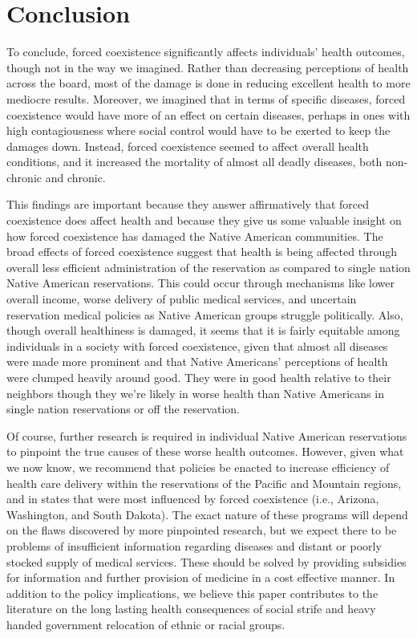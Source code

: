 \documentclass[12pt]{article}
\begin{document}
\section{Conclusion}
To conclude, forced coexistence significantly affects individuals’ health outcomes, though not in the way we imagined.
Rather than decreasing perceptions of health across the board, most of the damage is done in reducing excellent health to more mediocre results.  
Moreover, we imagined that in terms of specific diseases, forced coexistence would have more of an effect on certain diseases, perhaps in ones with high contagiousness where social control would have to be exerted to keep the damages down.  
Instead, forced coexistence seemed to affect overall health conditions, and it increased the mortality of almost all deadly diseases, both non-chronic and chronic.

This findings are important because they answer affirmatively that forced coexistence does affect health and because they give us some valuable insight on how forced coexistence has damaged the Native American communities. 
The broad effects of forced coexistence suggest that health is being affected through overall less efficient administration of the reservation as compared to single nation Native American reservations.  
This could occur through mechanisms like lower overall income, worse delivery of public medical services, and uncertain reservation medical policies as Native American groups struggle politically. 
Also, though overall healthiness is damaged, it seems that it is fairly equitable among individuals in a society with forced coexistence, given that almost all diseases were made more prominent and that Native Americans’ perceptions of health were clumped heavily around good. 
They were in good health relative to their neighbors though they we’re likely in worse health than Native Americans in single nation reservations or off the reservation.  

Of course, further research is required in individual Native American reservations to pinpoint the true causes of these worse health outcomes. 
However, given what we now know, we recommend that policies be enacted to increase efficiency of health care delivery within the reservations of the Pacific and Mountain regions, and in states that were most influenced by forced coexistence (i.e., Arizona, Washington, and South Dakota).
The exact nature of these programs will depend on the flaws discovered by more pinpointed research, but we expect there to be problems of insufficient information regarding diseases and distant or poorly stocked supply of medical services. 
These should be solved by providing subsidies for information and further provision of medicine in a cost effective manner. 
In addition to the policy implications, we believe this paper contributes to the literature on the long lasting health consequences of social strife and heavy handed government relocation of ethnic or racial groups.


\newpage


\end{document}
